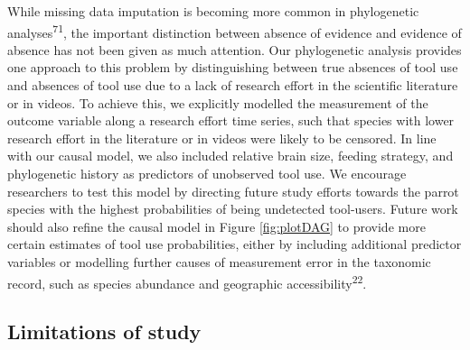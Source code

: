\documentclass[
  man, donotrepeattitle,floatsintext]{apa6}
\begin{document}
While missing data imputation is becoming more common in phylogenetic
analyses\textsuperscript{71}, the important distinction between absence of
evidence and evidence of absence has not been given as much attention. Our
phylogenetic analysis provides one approach to this problem by distinguishing
between true absences of tool use and absences of tool use due to a lack of
research effort in the scientific literature or in videos. To achieve this, we
explicitly modelled the measurement of the outcome variable along a research
effort time series, such that species with lower research effort in the
literature or in videos were likely to be censored. In line with our causal
model, we also included relative brain size, feeding strategy, and phylogenetic
history as predictors of unobserved tool use. We encourage researchers to test
this model by directing future study efforts towards the parrot species with the
highest probabilities of being undetected tool-users. Future work should also
refine the causal model in Figure \ref{fig:plotDAG} to provide more certain
estimates of tool use probabilities, either by including additional predictor
variables or modelling further causes of measurement error in the taxonomic
record, such as species abundance and geographic accessibility\textsuperscript{22}.

\hypertarget{limitations-of-study}{%
\subsection{Limitations of study}\label{limitations-of-study}}
\end{document}
